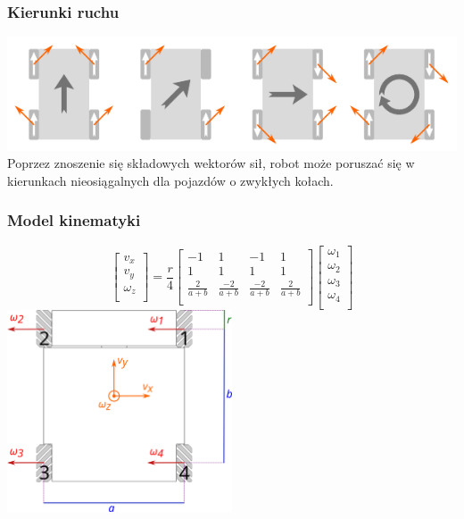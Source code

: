 \documentclass{beamer}
\begin{document}
	\begin{frame}
		\frametitle{Kierunki ruchu}
		\centering
		\includegraphics[width=\textwidth]{graphics/mecanum_dirs_vect.pdf} \\
		Poprzez znoszenie się składowych wektorów sił, robot może poruszać się w kierunkach nieosiągalnych dla pojazdów o zwykłych kołach.
	\end{frame}
	
	\begin{frame}
		\frametitle{Model kinematyki}
		\[
		\begin{bmatrix}
		v_x \\
		v_y \\
		\omega_z \\
		\end{bmatrix}
		=
		\frac{r}{4}
		\begin{bmatrix}
		-1 & 1 & -1 & 1 \\
		1 & 1 & 1 & 1 \\
		\frac{2}{a+b} & \frac{-2}{a+b} & \frac{-2}{a+b} & \frac{2}{a+b} \\
		\end{bmatrix}
		\begin{bmatrix}
		\omega_1 \\
		\omega_2 \\
		\omega_3 \\
		\omega_4 \\
		\end{bmatrix}
		\]
		\centering
		\includegraphics[width=0.5\textwidth]{graphics/base_dims.pdf} 
	\end{frame}
\end{document}
